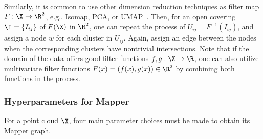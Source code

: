 Similarly, it is common to use other dimension reduction techniques as filter map $F:\X\to \R^2$, e.g., Isomap, PCA, or UMAP~\cite{rather2022umap}. Then, for an open covering $\I=\{I_{ij}\}$ of $F(\X)$ in $\R^2$, one can repeat the process of $U_{ij}=F^{-1}(I_{ij})$, and assign a node $w$ for each cluster in $U_{ij}$. Again, assign an edge between the nodes when the corresponding clusters have nontrivial intersections. Note that if the domain of the data offers good filter functions $f,g:\X\to\R$,  one can also utilize multivariate filter functions $F(x)=(f(x),g(x))\in\R^2$ by combining both functions in the process. 


\subsubsection{Hyperparameters for Mapper} \label{sec:mapperParams}
For a point cloud $\X$, four main parameter choices must be made to obtain its Mapper graph. 



